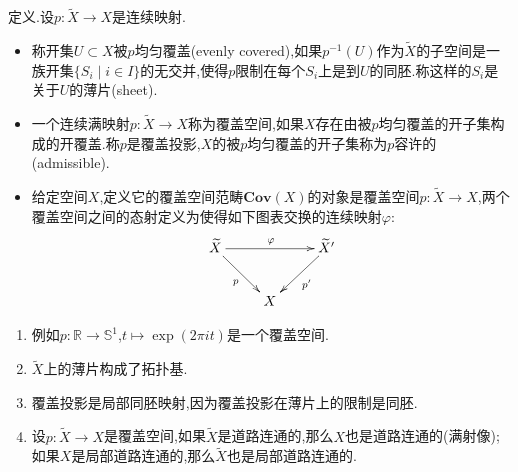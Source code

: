 定义.设$p:\widetilde{X}\to X$是连续映射.
\begin{itemize}
	\item 称开集$U\subset X$被$p$均匀覆盖(evenly covered),如果$p^{-1}(U)$作为$\widetilde{X}$的子空间是一族开集$\{S_i\mid i\in I\}$的无交并,使得$p$限制在每个$S_i$上是到$U$的同胚.称这样的$S_i$是关于$U$的薄片(sheet).
	\item 一个连续满映射$p:\widetilde{X}\to X$称为覆盖空间,如果$X$存在由被$p$均匀覆盖的开子集构成的开覆盖.称$p$是覆盖投影,$X$的被$p$均匀覆盖的开子集称为$p$容许的(admissible).
	\item 给定空间$X$,定义它的覆盖空间范畴$\textbf{Cov}(X)$的对象是覆盖空间$p:\widetilde{X}\to X$,两个覆盖空间之间的态射定义为使得如下图表交换的连续映射$\varphi$:
	$$\xymatrix{\widetilde{X}\ar[dr]_{p}\ar[rr]^{\varphi}&&\widetilde{X}'\ar[dl]^{p'}\\&X&}$$
\end{itemize}
\begin{enumerate}
	\item 例如$p:\mathbb{R}\to\mathbb{S}^1$,$t\mapsto\exp(2\pi it)$是一个覆盖空间.
	\item $\widetilde{X}$上的薄片构成了拓扑基.
	\item 覆盖投影是局部同胚映射,因为覆盖投影在薄片上的限制是同胚.
	\item 设$p:\widetilde{X}\to X$是覆盖空间,如果$\widetilde{X}$是道路连通的,那么$X$也是道路连通的(满射像);如果$X$是局部道路连通的,那么$\widetilde{X}$也是局部道路连通的.
\end{enumerate}


